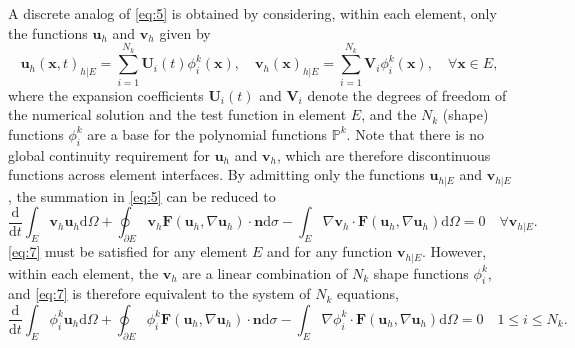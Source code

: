 \documentclass{develop-note}
\begin{document}
A discrete analog of \autoref{eq:5} is obtained by considering, within each element, only the functions $\mathbf{u}_{h}$ and $\mathbf{v}_{h}$ given by
\begin{equation}
  \mathbf{u}_{h}(\mathbf{x},t)_{h|E}=\sum_{i=1}^{N_{k}}\mathbf{U}_{i}(t)\phi_{i}^{k}(\mathbf{x}),\quad\mathbf{v}_{h}(\mathbf{x})_{h|E}=\sum_{i=1}^{N_{k}}\mathbf{V}_{i}\phi_{i}^{k}(\mathbf{x}),\quad\forall\mathbf{x}\in E,
\end{equation}
where the expansion coefficients $\mathbf{U}_{i}(t)$ and $\mathbf{V}_{i}$ denote the degrees of freedom of the numerical solution and the test function in element $E$, and the $N_{k}$ (shape) functions $\phi_{i}^{k}$ are a base for the polynomial functions $\mathbb{P}^{k}$. Note that there is no global continuity requirement for $\mathbf{u}_{h}$ and $\mathbf{v}_{h}$, which are therefore discontinuous functions across element interfaces. By admitting only the functions $\mathbf{u}_{h|E}$ and $\mathbf{v}_{h|E}$, the summation in \autoref{eq:5} can be reduced to
\begin{equation}
  \label{eq:7}
  \dfrac{\mathrm{d}}{\mathrm{d}t}\int_{E}\mathbf{v}_{h}\mathbf{u}_{h}\mathrm{d}\Omega+\oint_{\partial E}\mathbf{v}_{h}\mathbf{F}(\mathbf{u}_{h},\nabla\mathbf{u}_{h})\cdot\mathbf{n}\mathrm{d}\sigma-\int_{E}\nabla\mathbf{v}_{h}\cdot\mathbf{F}(\mathbf{u}_{h},\nabla\mathbf{u}_{h})\mathrm{d}\Omega=0\quad\forall\mathbf{v}_{h|E}.
\end{equation}
\autoref{eq:7} must be satisfied for any element $E$ and for any function $\mathbf{v}_{h|E}$. However, within each element, the $\mathbf{v}_{h}$ are a linear combination of $N_{k}$ shape functions $\phi_{i}^{k}$, and \autoref{eq:7} is therefore equivalent to the system of $N_{k}$ equations,
\begin{equation}
  \label{eq:8}
  \dfrac{\mathrm{d}}{\mathrm{d}t}\int_{E}\phi_{i}^{k}\mathbf{u}_{h}\mathrm{d}\Omega+\oint_{\partial E}\phi_{i}^{k}\mathbf{F}(\mathbf{u}_{h},\nabla\mathbf{u}_{h})\cdot\mathbf{n}\mathrm{d}\sigma-\int_{E}\nabla\phi_{i}^{k}\cdot\mathbf{F}(\mathbf{u}_{h},\nabla\mathbf{u}_{h})\mathrm{d}\Omega=0\quad 1\leqslant i\leqslant N_{k}.
\end{equation}
\end{document}
